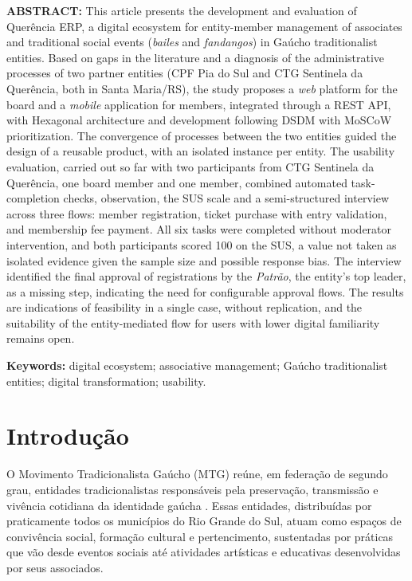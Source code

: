 \documentclass[12pt,a4paper]{article}
\begin{document}
\clearpage
\noindent\textbf{ABSTRACT:} This article presents the development and evaluation of Querência ERP, a
digital ecosystem for entity-member management of associates and traditional social events
(\textit{bailes} and \textit{fandangos}) in Gaúcho traditionalist entities. Based on gaps in the
literature and a diagnosis of the administrative processes of two partner entities (CPF Pia do Sul
and CTG Sentinela da Querência, both in Santa Maria/RS), the study proposes a \textit{web} platform
for the board and a \textit{mobile} application for members, integrated through a REST API, with
Hexagonal architecture and development following DSDM with MoSCoW prioritization. The convergence of
processes between the two entities guided the design of a reusable product, with an isolated instance
per entity. The usability evaluation, carried out so far with two participants from CTG Sentinela da
Querência, one board member and one member, combined automated task-completion checks, observation,
the SUS scale and a semi-structured interview across three flows: member registration, ticket purchase
with entry validation, and membership fee payment. All six tasks were completed without moderator
intervention, and both participants scored 100 on the SUS, a value not taken as isolated evidence
given the sample size and possible response bias. The interview identified the final approval of
registrations by the \textit{Patrão}, the entity's top leader, as a missing step, indicating the need
for configurable approval flows. The results are indications of feasibility in a single case, without
replication, and the suitability of the entity-mediated flow for users with lower digital familiarity
remains open.

\vspace{\baselineskip}
\noindent\textbf{Keywords:} digital ecosystem; associative management; Gaúcho traditionalist entities; digital transformation; usability.

\section{Introdução}

O Movimento Tradicionalista Gaúcho (MTG) reúne, em federação de segundo grau, entidades
tradicionalistas responsáveis pela preservação, transmissão e vivência cotidiana da identidade
gaúcha \parencite{mtg2021}. Essas
entidades, distribuídas por praticamente todos os municípios do Rio Grande do Sul, atuam como
espaços de convivência social, formação cultural e pertencimento, sustentadas por práticas que vão
desde eventos sociais até atividades artísticas e educativas desenvolvidas por seus associados.
\end{document}
